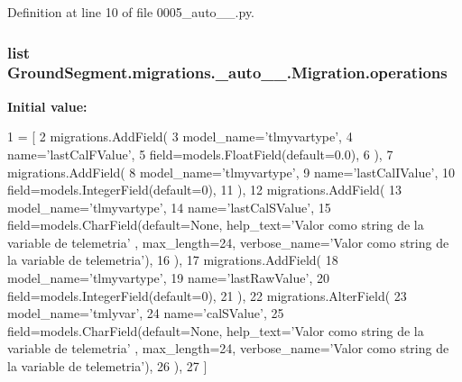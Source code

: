 Definition at line 10 of file 0005\+\_\+auto\+\_\+\_.\+py.

\hypertarget{class_ground_segment_1_1migrations_1_10005__auto__20161126__1606_1_1_migration_a83a5b4dcd85328de4dd7af7c3b585ea3}{}
\subsubsection[{operations}]{\setlength{\rightskip}{0pt plus 5cm}list Ground\+Segment.\+migrations.\+\_\+auto\+\_\+\_.\+Migration.\+operations\hspace{0.3cm}{\ttfamily [static]}}\label{class_ground_segment_1_1migrations_1_10005__auto__20161126__1606_1_1_migration_a83a5b4dcd85328de4dd7af7c3b585ea3}
{\bfseries Initial value\+:}
\begin{DoxyCode}
1 = [
2         migrations.AddField(
3             model\_name=\textcolor{stringliteral}{'tlmyvartype'},
4             name=\textcolor{stringliteral}{'lastCalFValue'},
5             field=models.FloatField(default=0.0),
6         ),
7         migrations.AddField(
8             model\_name=\textcolor{stringliteral}{'tlmyvartype'},
9             name=\textcolor{stringliteral}{'lastCalIValue'},
10             field=models.IntegerField(default=0),
11         ),
12         migrations.AddField(
13             model\_name=\textcolor{stringliteral}{'tlmyvartype'},
14             name=\textcolor{stringliteral}{'lastCalSValue'},
15             field=models.CharField(default=\textcolor{keywordtype}{None}, help\_text=\textcolor{stringliteral}{'Valor como string de la variable de telemetria'}
      , max\_length=24, verbose\_name=\textcolor{stringliteral}{'Valor como string de la variable de telemetria'}),
16         ),
17         migrations.AddField(
18             model\_name=\textcolor{stringliteral}{'tlmyvartype'},
19             name=\textcolor{stringliteral}{'lastRawValue'},
20             field=models.IntegerField(default=0),
21         ),
22         migrations.AlterField(
23             model\_name=\textcolor{stringliteral}{'tmlyvar'},
24             name=\textcolor{stringliteral}{'calSValue'},
25             field=models.CharField(default=\textcolor{keywordtype}{None}, help\_text=\textcolor{stringliteral}{'Valor como string de la variable de telemetria'}
      , max\_length=24, verbose\_name=\textcolor{stringliteral}{'Valor como string de la variable de telemetria'}),
26         ),
27     ]
\end{DoxyCode}


